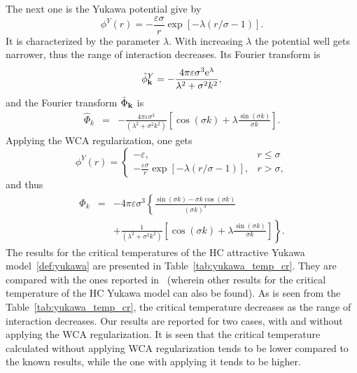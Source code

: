 The next one is the Yukawa potential give by 
\begin{equation}
	\label{def:yukawa}
	\phi^Y(r) = -\frac{\varepsilon \sigma}{r} \exp[-\lambda(r/\sigma - 1)].
\end{equation}
It is characterized by the parameter $\lambda$. With increasing $\lambda$ the potential well gets narrower, thus the range of interaction decreases.
Its Fourier transform is
\begin{equation*}
	\hat{\phi}^Y_{\vb k} = -\frac{4\pi \varepsilon \sigma^3 {\rm e}^{\lambda}}{\lambda^2 + \sigma^2 k^2},
\end{equation*}
and the Fourier transform $\hat{\Phi}_{\vb k}$ is
\begin{eqnarray*}
	\label{eq:part_yukawa_fourier}
	\hat{\Phi}_k & = & -\frac{4\pi \varepsilon\sigma^3}{(\lambda^2 + \sigma^2 k^2)}
	\left[\cos(\sigma k) + \lambda \frac{\sin(\sigma k)}{\sigma k} \right].
\end{eqnarray*}
Applying the WCA regularization, one gets
\begin{equation}
	\label{def:yukawa_wca}
	\phi^Y(r) = \left\{
	\begin{array}{ll}
		-\varepsilon, & r \leq \sigma 
		\\
		-\frac{\varepsilon \sigma}{r} \exp[-\lambda(r/\sigma - 1)], & r > \sigma,
	\end{array}
	\right.
\end{equation}
and thus
\begin{eqnarray*}
	\label{eq:wca_yukawa_fourier}
	\hat{\Phi}_k & = & -4\pi \varepsilon\sigma^3 \left\{ 
	\frac{\sin(\sigma k) - \sigma k \cos(\sigma k)}{(\sigma k)^3}
	\right.
	\\
	&& \left. +\frac{1}{(\lambda^2 + \sigma^2 k^2)}
	\left[\cos(\sigma k) + \lambda \frac{\sin(\sigma k)}{\sigma k} \right]
	\right\}.
\end{eqnarray*}
The results for the critical temperatures of the HC attractive Yukawa model~\eqref{def:yukawa} are presented in Table~\ref{tab:yukawa_temp_cr}. They are compared with the ones reported in~\cite{MendoubWaxJakse2010} (wherein other results for the critical temperature of the HC Yukawa model can also be found). As is seen from the Table~\ref{tab:yukawa_temp_cr}, the critical temperature decreases as the range of interaction decreases. Our results are reported for two cases, with and without applying the WCA regularization. It is seen that the critical temperature calculated without applying WCA regularization tends to be lower compared to the known results, while the one with applying it tends to be higher.

